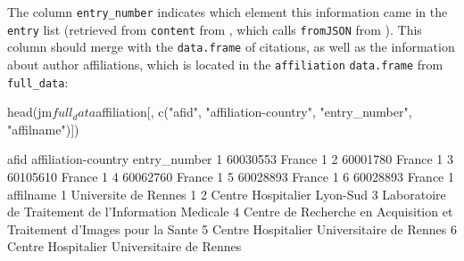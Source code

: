 \begin{Schunk}
\end{Schunk}

The column \texttt{entry\_number} indicates which element this
information came in the \texttt{entry} list (retrieved from
\texttt{content} from  \citep{httr}, which calls
\texttt{fromJSON} from  \citep{jsonlite}). This column
should merge with the \texttt{data.frame} of citations, as well as the
information about author affiliations, which is located in the
\texttt{affiliation} \texttt{data.frame} from \texttt{full\_data}:

\begin{Schunk}
\begin{Sinput}
head(jm$full_data$affiliation[, c("afid", "affiliation-country", "entry_number",  "affilname")])
\end{Sinput}
\begin{Soutput}
      afid affiliation-country entry_number
1 60030553              France            1
2 60001780              France            1
3 60105610              France            1
4 60062760              France            1
5 60028893              France            1
6 60028893              France            1
                                                                affilname
1                                                  Universite de Rennes 1
2                                             Centre Hospitalier Lyon-Sud
3                     Laboratoire de Traitement de l'Information Medicale
4 Centre de Recherche en Acquisition et Traitement d'Images pour la Sante
5                              Centre Hospitalier Universitaire de Rennes
6                              Centre Hospitalier Universitaire de Rennes
\end{Soutput}
\end{Schunk}

